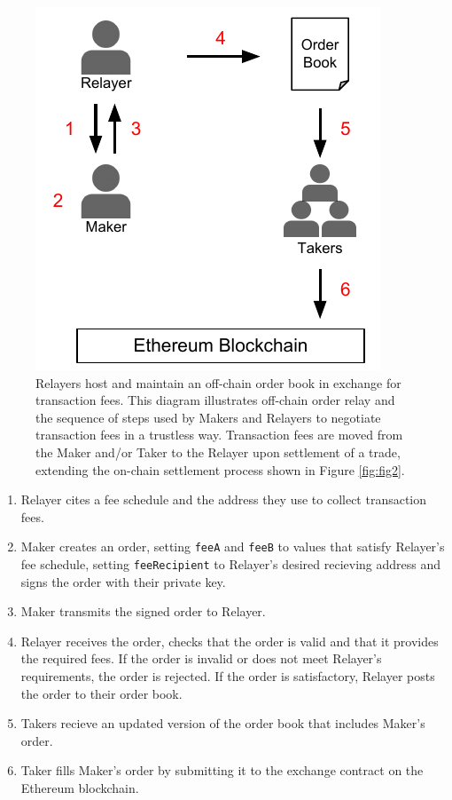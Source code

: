 \documentclass[10pt]{article}
\begin{document}
\begin{figure}[h]
    \centering
    \includegraphics[width=0.4\linewidth]{../figures/fig3.pdf}
    \caption{Relayers host and maintain an off-chain order book in exchange for transaction fees. This diagram illustrates off-chain order relay and the sequence of steps used by Makers and Relayers to negotiate transaction fees in a trustless way. Transaction fees are moved from the Maker and/or Taker to the Relayer upon settlement of a trade, extending the on-chain settlement process shown in Figure \ref{fig:fig2}.  }
    \label{fig:fig3}
\end{figure}

\begin{enumerate}[noitemsep]
\item Relayer cites a fee schedule and the address they use to collect transaction fees. 
\item Maker creates an order, setting \texttt{feeA} and \texttt{feeB} to values that satisfy Relayer's fee schedule, setting \texttt{feeRecipient} to Relayer's desired recieving address and signs the order with their private key. 
\item Maker transmits the signed order to Relayer.
\item Relayer receives the order, checks that the order is valid and that it provides the required fees. If the order is invalid or does not meet Relayer's requirements, the order is rejected. If the order is satisfactory, Relayer posts the order to their order book.
\item Takers recieve an updated version of the order book that includes Maker's order.
\item Taker fills Maker's order by submitting it to the exchange contract on the Ethereum blockchain.
\end{enumerate}

\clearpage
\end{document}
